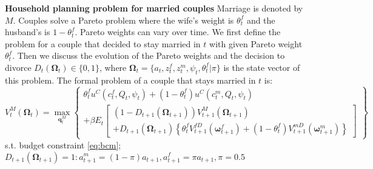 \documentclass[12pt]{article}
\numberwithin{table}{section}
\begin{document}
\textbf{Household planning problem for married couples} Marriage is denoted by $M$. Couples solve a Pareto problem where the wife's weight is $\theta^f_t$ and the husband's is $1-\theta^f_t$. Pareto weights can vary over time. We first define the problem for a couple that decided to stay married in $t$ with given Pareto weight $\theta^f_t$. Then we discuss the evolution of the Pareto weights and the decision to divorce $D_{t}(\boldsymbol{\Omega}_{t})\in\{0,1\}$, where $\boldsymbol{\Omega}_t=\{a_t,z^f_t,z^m_t,\psi_t,\theta^f_t | \pi\}$ is the state vector of this problem. The formal problem of a couple that stays married in $t$ is:
\begin{equation}
	V_t^{M}(\boldsymbol{\Omega}_t)=\max_{\mathbf{q}^{M}_t} \left\{\begin{array}{c}
		\theta_t^f u^C(c_t^f, Q_t, \psi_t)+(1-\theta_t^f) u^C(c_t^m, Q_t, \psi_t) \\
		+\beta E_t\left[\begin{array}{c}
			(1-D_{t+1}(\boldsymbol{\Omega}_{t+1})) V_{t+1}^{M}(\boldsymbol{\Omega}_{t + 1}) \\
			+D_{t+1}(\boldsymbol{\Omega}_{t+1})\left\{\theta_t^f V_{t+1}^{fD}(\boldsymbol{\omega}_{t + 1}^f)+(1-\theta_t^f) V_{t+1}^{mD}(\boldsymbol{\omega}_{t+1}^m)\right\}
		\end{array}\right]
	\end{array}\right\}
\end{equation}
s.t. budget constraint \eqref{eq:bcm}; $D_{t+1}(\boldsymbol{\Omega}_{t+1})=1: a^m_{t+1}=(1-\pi) a_{t+1}, a^f_{t+1}=\pi a_{t+1}, \pi=0.5$ 
\end{document}
